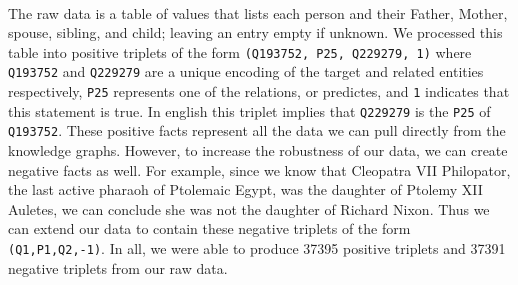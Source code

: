 \documentclass[11.5pt]{article}
\begin{document}
\paragraph{} The raw data is a table of values that lists each person and their Father, Mother, spouse, sibling, and child; leaving an entry empty if unknown. We processed this table into positive triplets of the form \texttt{(Q193752, P25, Q229279, 1)} where \texttt{Q193752} and \texttt{Q229279} are a unique encoding of the target and related entities respectively, \texttt{P25} represents one of the relations, or predictes, and \texttt{1} indicates that this statement is true. In english this triplet implies that \texttt{Q229279} is the \texttt{P25} of \texttt{Q193752}. These positive facts represent all the data we can pull directly from the knowledge graphs. However, to increase the robustness of our data, we can create negative facts as well. For example, since we know that Cleopatra VII Philopator, the last active pharaoh of Ptolemaic Egypt, was the daughter of Ptolemy XII Auletes, we can conclude she was not the daughter of Richard Nixon. Thus we can extend our data to contain these negative triplets of the form \texttt{(Q1,P1,Q2,-1)}. In all, we were able to produce 37395 positive triplets and 37391 negative triplets from our raw data. 
\end{document}
